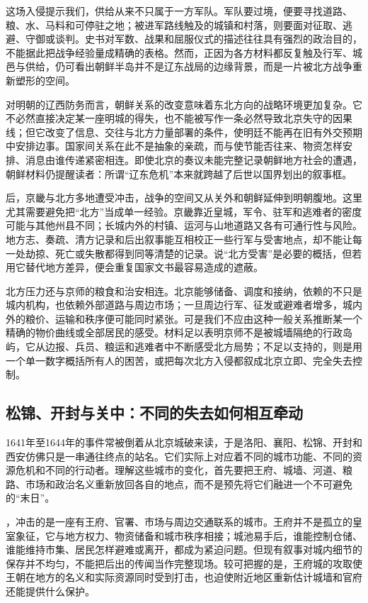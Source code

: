 这场入侵提示我们，供给从来不只属于一方军队。军队要过境，便要寻找道路、粮、水、马料和可停驻之地；被进军路线触及的城镇和村落，则要面对征取、逃避、守御或谈判。史书对军数、战果和屈服仪式的描述往往具有强烈的政治目的，不能据此把战争经验量成精确的表格。然而，正因为各方材料都反复触及行军、城邑与供给，仍可看出朝鲜半岛并不是辽东战局的边缘背景，而是一片被北方战争重新塑形的空间。

对明朝的辽西防务而言，朝鲜关系的改变意味着东北方向的战略环境更加复杂。它不必然直接决定某一座明城的得失，也不能被写作一条必然导致北京失守的因果线；但它改变了信息、交往与北方力量部署的条件，使明廷不能再在旧有外交预期中安排边事。国家间关系在此不是抽象的亲疏，而与使节能否往来、物资怎样安排、消息由谁传递紧密相连。即使北京的奏议未能完整记录朝鲜地方社会的遭遇，朝鲜材料仍提醒读者：所谓“辽东危机”本来就跨越了后世以国界划出的叙事框。

后，京畿与北方多地遭受冲击，战争的空间又从关外和朝鲜延伸到明朝腹地。这里尤其需要避免把“北方”当成单一经验。京畿靠近皇城，军令、驻军和逃难者的密度可能与其他州县不同；长城内外的村镇、运河与山地道路又各有可通行性与风险。地方志、奏疏、清方记录和后出叙事能互相校正一些行军与受害地点，却不能让每一处劫掠、死亡或失散都得到同等清楚的记录。说“北方受害”是必要的概括，但若用它替代地方差异，便会重复国家文书最容易造成的遮蔽。

北方压力还与京师的粮食和治安相连。北京能够储备、调度和接纳，依赖的不只是城内机构，也依赖外部道路与周边市场；一旦周边行军、征发或避难者增多，城内外的粮价、运输和秩序便可能同时紧张。可是我们不应由这种一般关系推断某一个精确的物价曲线或全部居民的感受。材料足以表明京师不是被城墙隔绝的行政岛屿，它从边报、兵员、粮运和逃难者中不断感受北方局势；不足以支持的，则是用一个单一数字概括所有人的困苦，或把每次北方入侵都叙成北京立即、完全失去控制。

\subsection{松锦、开封与关中：不同的失去如何相互牵动}

1641年至1644年的事件常被倒着从北京城破来读，于是洛阳、襄阳、松锦、开封和西安仿佛只是一串通往终点的站名。它们实际上对应着不同的城市功能、不同的资源危机和不同的行动者。理解这些城市的变化，首先要把王府、城墙、河道、粮路、市场和政治名义重新放回各自的地点，而不是预先将它们融进一个不可避免的“末日”。

，冲击的是一座有王府、官署、市场与周边交通联系的城市。王府并不是孤立的皇室象征，它与地方权力、物资储备和城市秩序相接；城池易手后，谁能控制仓储、谁能维持市集、居民怎样避难或离开，都成为紧迫问题。但现有叙事对城内细节的保存并不均匀，不能把后出的传闻当作完整现场。较可把握的是，王府城的攻取使王朝在地方的名义和实际资源同时受到打击，也迫使附近地区重新估计城墙和官府还能提供什么保护。

